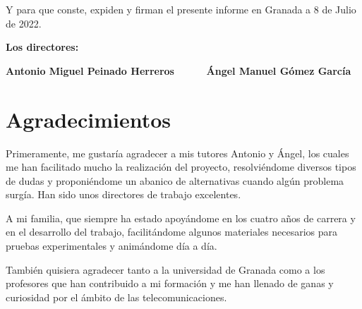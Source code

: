\vspace{0.5cm}

Y para que conste, expiden y firman el presente informe en Granada a 8 de Julio de 2022.

\vspace{1cm}

\textbf{Los directores:}

\vspace{5cm}

\noindent \textbf{Antonio Miguel Peinado Herreros \ \ \ \ \ Ángel Manuel Gómez García}

\chapter*{Agradecimientos}
\thispagestyle{empty}

       \vspace{1cm}


Primeramente, me gustaría agradecer a mis tutores Antonio y Ángel, los cuales me han facilitado mucho la realización del proyecto, resolviéndome diversos tipos de dudas y proponiéndome un abanico de alternativas cuando algún problema surgía. Han sido unos directores de trabajo excelentes.

       \vspace{1cm}

A mi familia, que siempre ha estado apoyándome en los cuatro años de carrera y en el desarrollo del trabajo, facilitándome algunos materiales necesarios para pruebas experimentales y animándome día a día.

       \vspace{1cm}

También quisiera agradecer tanto a la universidad de Granada como a los profesores que han contribuido a mi formación y me han llenado de ganas y curiosidad por el ámbito de las telecomunicaciones.


